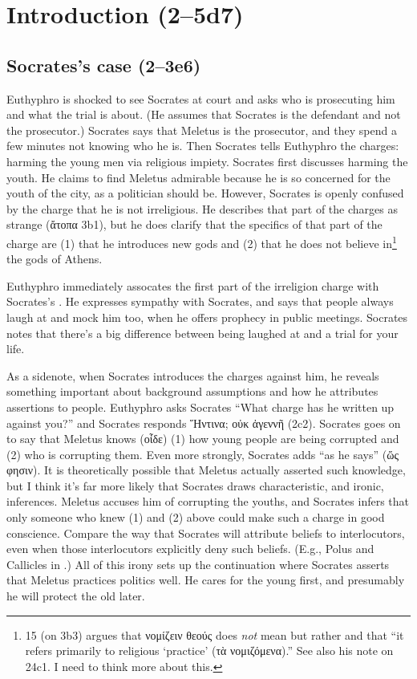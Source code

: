 \documentclass[11pt]{article}
\begin{document}

\section{Introduction (2--5d7)}

\subsection{Socrates's case (2--3e6)}

Euthyphro is shocked to see Socrates at court and asks who is prosecuting him and what the trial is about.  (He assumes that Socrates is the defendant and not the prosecutor.)  Socrates says that Meletus is the prosecutor, and they spend a few minutes not knowing who he is.  Then Socrates tells Euthyphro the charges: harming the young men via religious impiety.  Socrates first discusses harming the youth.  He claims to find Meletus admirable because he is so concerned for the youth of the city, as a politician should be.  However, Socrates is openly confused by the charge that he is not irreligious.  He describes that part of the charges as strange ({\g ἄτοπα} 3b1), but he does clarify that the specifics of that part of the charge are (1) that he introduces new gods and (2) that he does not believe in\footnote{\citet{burnet1924} 15 (on 3b3) argues that {\g νομίζειν θεούς} does \emph{not} mean  but rather  and that ``it refers primarily to religious `practice' ({\g τὰ νομιζόμενα}).''  See also his note on  24c1.  I need to think more about this.} the gods of Athens.

Euthyphro immediately assocates the first part of the irreligion charge with Socrates's .  He expresses sympathy with Socrates, and says that people always laugh at and mock him too, when he offers prophecy in public meetings.  Socrates notes that there's a big difference between being laughed at and a trial for your life.

As a sidenote, when Socrates introduces the charges against him, he reveals something important about background assumptions and how he attributes assertions to people.  Euthyphro asks Socrates ``What charge has he written up against you?'' and Socrates responds {\g Ἥντινα; οὐκ ἀγεννῆ} (2c2).  Socrates goes on to say that Meletus knows ({\g οἶδε}) (1) how young people are being corrupted and (2) who is corrupting them.  Even more strongly, Socrates adds ``as he says'' ({\g ὥς φησιν}).  It is theoretically possible that Meletus actually asserted such knowledge, but I think it's far more likely that Socrates draws characteristic, and ironic, inferences.  Meletus accuses him of corrupting the youths, and Socrates infers that only someone who knew (1) and (2) above could make such a charge in good conscience.  Compare the way that Socrates will attribute beliefs to interlocutors, even when those interlocutors explicitly deny such beliefs.  (E.g., Polus and Callicles in .) All of this irony sets up the continuation where Socrates asserts that Meletus practices politics well.  He cares for the young first, and presumably he will protect the old later.
\end{document}
